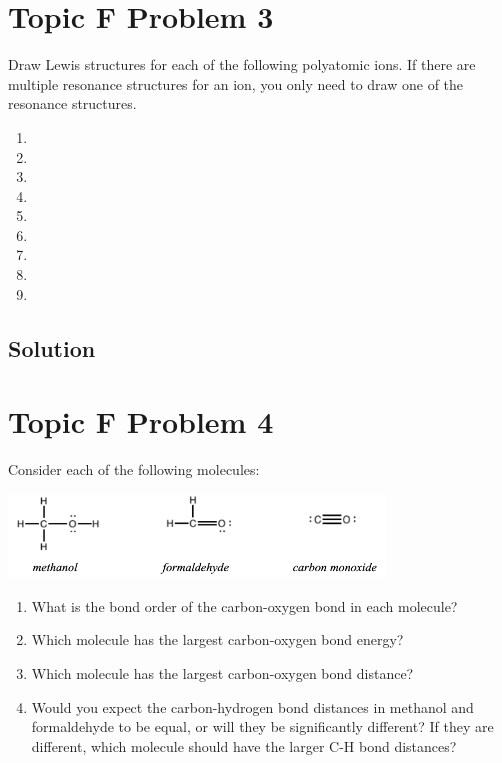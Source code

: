\documentclass[10pt]{article}
\begin{document}
    \section{Topic F Problem 3}
        Draw Lewis structures for each of the following polyatomic ions. 
        If there are multiple resonance structures for an ion, you only need to draw one of the resonance structures.
        \begin{multicols}{3}
            \begin{enumerate}[label=\alph*)]
                \item   {}
                \item   {}
                \item   {}
                \item   {}
                \item   {}
                \item   {}
                \item   {}
                \item   {}
                \item   {}
            \end{enumerate}
        \end{multicols}
        
        \subsection{Solution}


    \pagebreak
    \section{Topic F Problem 4}
        Consider each of the following molecules:
        \begin{center}
            \includegraphics[width=0.75\textwidth]{img-F4.png}
        \end{center}
        \begin{enumerate}[label=\alph*)]
            \item   What is the bond order of the carbon-oxygen bond in each molecule?
            \item   Which molecule has the largest carbon-oxygen bond energy?
            \item   Which molecule has the largest carbon-oxygen bond distance?
            \item   Would you expect the carbon-hydrogen bond distances in methanol and formaldehyde to be equal, or will they be significantly different? 
                If they are different, which molecule should have the larger C-H bond distances?
        \end{enumerate}
        
\end{document}

